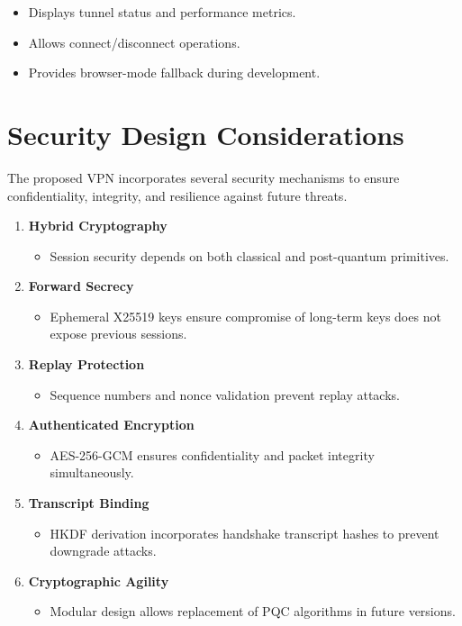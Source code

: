 \begin{itemize}
    \item Displays tunnel status and performance metrics.
    \item Allows connect/disconnect operations.
    \item Provides browser-mode fallback during development.
\end{itemize}

\section{Security Design Considerations}

The proposed VPN incorporates several security mechanisms to ensure confidentiality, integrity, and resilience against future threats.

\begin{enumerate}
    \item \textbf{Hybrid Cryptography}
    \begin{itemize}
        \item Session security depends on both classical and post-quantum primitives.
    \end{itemize}

    \item \textbf{Forward Secrecy}
    \begin{itemize}
        \item Ephemeral X25519 keys ensure compromise of long-term keys does not expose previous sessions.
    \end{itemize}

    \item \textbf{Replay Protection}
    \begin{itemize}
        \item Sequence numbers and nonce validation prevent replay attacks.
    \end{itemize}

    \item \textbf{Authenticated Encryption}
    \begin{itemize}
        \item AES-256-GCM ensures confidentiality and packet integrity simultaneously.
    \end{itemize}

    \item \textbf{Transcript Binding}
    \begin{itemize}
        \item HKDF derivation incorporates handshake transcript hashes to prevent downgrade attacks.
    \end{itemize}

    \item \textbf{Cryptographic Agility}
    \begin{itemize}
        \item Modular design allows replacement of PQC algorithms in future versions.
    \end{itemize}
\end{enumerate}

